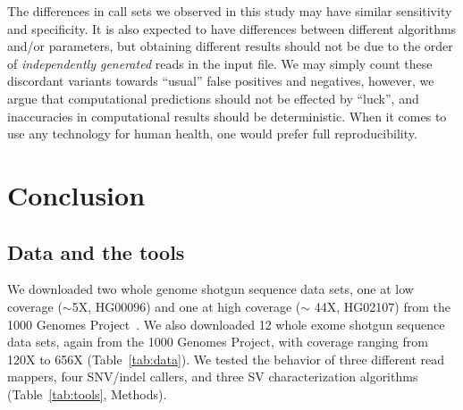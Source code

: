 \documentclass{bioinfo}
\begin{document}
\begin{methods}
The differences in call sets we observed in this study 
may have similar sensitivity and specificity.
It is also expected to
have differences between different algorithms and/or parameters, but
obtaining different results should not be due to the order of {\it independently generated} reads in the input file. 
We may simply count these discordant variants towards ``usual'' false positives and negatives, however, 
we argue that computational predictions should not be effected by ``luck'', and inaccuracies in computational results should be deterministic.
When it comes to use any technology for human health, one would prefer full reproducibility. 


\section{Conclusion}

\subsection*{Data and the tools}
We downloaded two whole genome shotgun sequence data sets, one at low coverage ($\sim$5X, HG00096) and one at high coverage ($\sim$ 44X, HG02107) from the 1000 Genomes Project~\citep{1000GP2012}.
We also downloaded 12 whole exome shotgun sequence data sets, again from the 1000 Genomes Project, with coverage ranging from 120X to 656X (Table~\ref{tab:data}). We tested the behavior of 
three different read mappers, four SNV/indel callers, and three SV characterization algorithms (Table~\ref{tab:tools}, Methods).


\end{methods}
\end{document}
